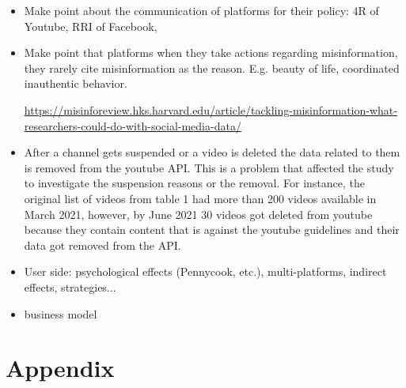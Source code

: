 \documentclass[11pt,a4paper]{article}
\begin{document}
{\begin{itemize}
	\item Make point about the communication of platforms for their policy: 4R of Youtube, RRI of Facebook, 

	\item Make point that platforms when they take actions regarding misinformation, they rarely cite misinformation as the reason. E.g. beauty of life, coordinated inauthentic behavior. 

\href{https://misinforeview.hks.harvard.edu/article/tackling-misinformation-what-researchers-could-do-with-social-media-data/}{https://misinforeview.hks.harvard.edu/article/tackling-misinformation-what-researchers-could-do-with-social-media-data/}

	\item After a channel gets suspended or a video is deleted the data related to them is removed from the youtube API. This is a problem that affected the study to investigate the suspension reasons or the removal. For instance, the original list of videos from table 1 had more than 200 videos available in March 2021, however, by June 2021 30 videos got deleted from youtube because they contain content that is against the youtube guidelines and their data got removed from the API. 
	
	\item User side: psychological effects (Pennycook, etc.), multi-platforms, indirect effects, strategies... 
	\item business model 
	
\end{itemize}}
\newpage 

{}


\section{Appendix}
\end{document}
